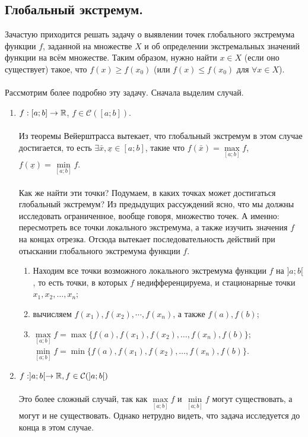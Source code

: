\subsection{Глобальный экстремум.}
Зачастую приходится решать задачу о выявлении точек глобального экстремума функции $f$, заданной на множестве $X$ и об определении экстремальных значений функции на всём множестве. Таким образом, нужно найти $x \in X$ (если оно существует) такое, что $f(x) \ge f(x_0)$ (или $f(x) \le f(x_0)$ для $\forall x \in X$).\\\\
Рассмотрим более подробно эту задачу. Сначала выделим случай.
\begin{enumerate}
	\item $f : [a;b] \rightarrow \mathbb{R}$, $f \in \mathcal{C}([a;b])$.\\\\
	Из теоремы Вейерштрасса вытекает, что глобальный экстремум в этом случае достигается, то есть $\exists \bar x, \underline{x} \in [a;b]$, такие что $f(\bar x) = \underset{[a;b]}{\max} f$, $f(\underline{x}) = \underset{[a;b]}{\min} f$.\\\\
	Как же найти эти точки? Подумаем, в каких точках может достигаться глобальный экстремум? Из предыдущих рассуждений ясно, что мы должны исследовать ограниченное, вообще говоря, множество точек. А именно: пересмотреть все точки локального экстремума, а также изучить значения $f$ на концах отрезка. Отсюда вытекает последовательность действий при отыскании глобального экстремума функции $f$.
	\begin{enumerate}
		\item Находим все точки возможного локального экстремума функции $f$ на $]a;b[$, то есть точки, в которых $f$ недифференцируема, и стационарные точки $x_1, x_2, \ldots, x_n$;
		\item вычисляем $f(x_1), f(x_2), \cdots, f(x_n)$, а также $f(a), f(b)$;
		\item $\underset{[a;b]}{\max} f = \max \{f(a),f(x_1), f(x_2), \ldots, f(x_n), f(b)\}$;\\
		$ \underset{[a;b]}{\min} f = \min \{f(a),f(x_1), f(x_2), \ldots, f(x_n), f(b)\}$.
	\end{enumerate}
	\item $f: ]a;b[ \rightarrow \mathbb{R}, f \in \mathcal{C}(]a;b[)$\\\\
	Это более сложный случай, так как $\underset{[a;b]}{\max} f$ и $\underset{[a;b]}{\min} f$ могут существовать, а могут и не существовать. Однако нетрудно видеть, что задача исследуется до конца в этом случае.\\\\

\end{enumerate}
